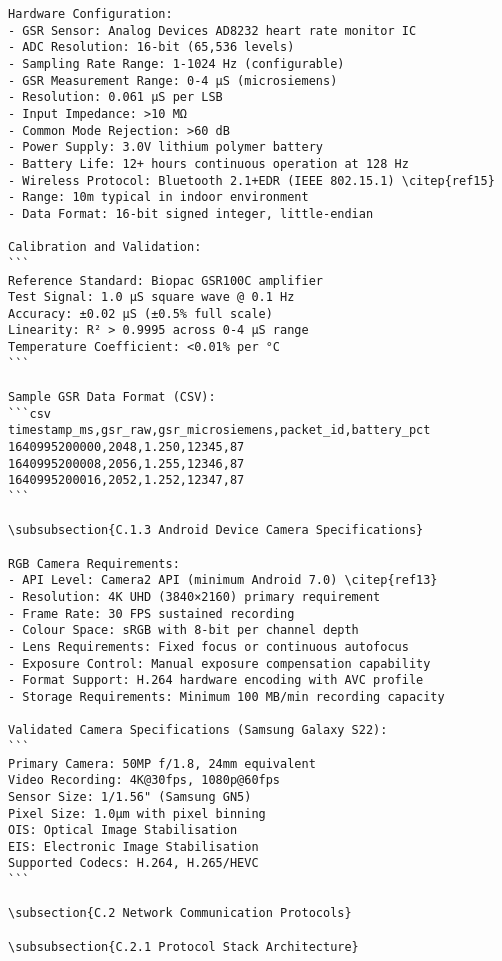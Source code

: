 \begin{verbatim}
Hardware Configuration:
- GSR Sensor: Analog Devices AD8232 heart rate monitor IC
- ADC Resolution: 16-bit (65,536 levels)
- Sampling Rate Range: 1-1024 Hz (configurable)
- GSR Measurement Range: 0-4 μS (microsiemens)
- Resolution: 0.061 μS per LSB
- Input Impedance: >10 MΩ
- Common Mode Rejection: >60 dB
- Power Supply: 3.0V lithium polymer battery
- Battery Life: 12+ hours continuous operation at 128 Hz
- Wireless Protocol: Bluetooth 2.1+EDR (IEEE 802.15.1) \citep{ref15}
- Range: 10m typical in indoor environment
- Data Format: 16-bit signed integer, little-endian

Calibration and Validation:
```
Reference Standard: Biopac GSR100C amplifier
Test Signal: 1.0 μS square wave @ 0.1 Hz
Accuracy: ±0.02 μS (±0.5% full scale)
Linearity: R² > 0.9995 across 0-4 μS range
Temperature Coefficient: <0.01% per °C
```

Sample GSR Data Format (CSV):
```csv
timestamp_ms,gsr_raw,gsr_microsiemens,packet_id,battery_pct
1640995200000,2048,1.250,12345,87
1640995200008,2056,1.255,12346,87
1640995200016,2052,1.252,12347,87
```

\subsubsection{C.1.3 Android Device Camera Specifications}

RGB Camera Requirements:
- API Level: Camera2 API (minimum Android 7.0) \citep{ref13}
- Resolution: 4K UHD (3840×2160) primary requirement
- Frame Rate: 30 FPS sustained recording
- Colour Space: sRGB with 8-bit per channel depth
- Lens Requirements: Fixed focus or continuous autofocus
- Exposure Control: Manual exposure compensation capability
- Format Support: H.264 hardware encoding with AVC profile
- Storage Requirements: Minimum 100 MB/min recording capacity

Validated Camera Specifications (Samsung Galaxy S22):
```
Primary Camera: 50MP f/1.8, 24mm equivalent
Video Recording: 4K@30fps, 1080p@60fps
Sensor Size: 1/1.56" (Samsung GN5)
Pixel Size: 1.0μm with pixel binning
OIS: Optical Image Stabilisation
EIS: Electronic Image Stabilisation
Supported Codecs: H.264, H.265/HEVC
```

\subsection{C.2 Network Communication Protocols}

\subsubsection{C.2.1 Protocol Stack Architecture}


\end{verbatim}
